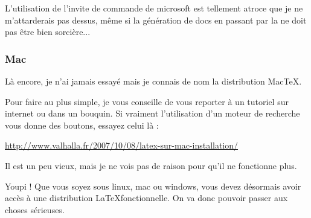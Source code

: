 L'utilisation de l'invite de commande de microsoft est tellement atroce que je ne m'attarderais pas dessus, même si la génération de docs en passant par la ne doit pas être bien sorcière...


\subsubsection{Mac} %
\label{ssub:Mac}

Là encore, je n'ai jamais essayé mais je connais de nom la distribution Mac\TeX.

Pour faire au plus simple, je vous conseille de vous reporter à un tutoriel sur internet ou dans un bouquin.
Si vraiment l'utilisation d'un moteur de recherche vous donne des boutons, essayez celui là :

\begin{center}
    \url{http://www.valhalla.fr/2007/10/08/latex-sur-mac-installation/}
\end{center}

Il est un peu vieux, mais je ne vois pas de raison pour qu'il ne fonctionne plus.



Youpi ! Que vous soyez sous linux, mac ou windows, vous devez désormais avoir accès à une distribution \LaTeX fonctionnelle.
On va donc pouvoir passer aux choses sérieuses.

